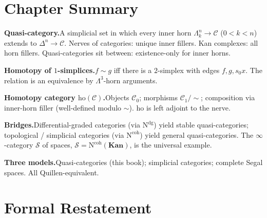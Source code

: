 \section*{Chapter Summary}

\begin{summarybox}
\textbf{Quasi-category.}\quad A simplicial set in which every inner horn
$\Lambda^n_k \to \mathcal{C}$ ($0 < k < n$) extends to $\Delta^n \to
\mathcal{C}$. Nerves of categories: unique inner fillers. Kan complexes:
all horn fillers. Quasi-categories sit between: existence-only for inner
horns.

\textbf{Homotopy of $1$-simplices.}\quad $f \sim g$ iff there is a
$2$-simplex with edges $f, g, s_0 x$. The relation is an equivalence by
$\Lambda^3$-horn arguments.

\textbf{Homotopy category $\mathrm{ho}(\mathcal{C})$.}\quad Objects
$\mathcal{C}_0$; morphisms $\mathcal{C}_1/\sim$; composition via
inner-horn filler (well-defined modulo $\sim$). $\mathrm{ho}$ is left
adjoint to the nerve.

\textbf{Bridges.}\quad Differential-graded categories (via $\mathrm{N}^{\mathrm{dg}}$)
yield stable quasi-categories; topological / simplicial categories (via
$\mathrm{N}^{\mathrm{coh}}$) yield general quasi-categories. The
$\infty$-category $\mathcal{S}$ of spaces, $\mathcal{S} =
\mathrm{N}^{\mathrm{coh}}(\mathbf{Kan})$, is the universal example.

\textbf{Three models.}\quad Quasi-categories (this book); simplicial
categories; complete Segal spaces. All Quillen-equivalent.
\end{summarybox}


\section*{Formal Restatement}

